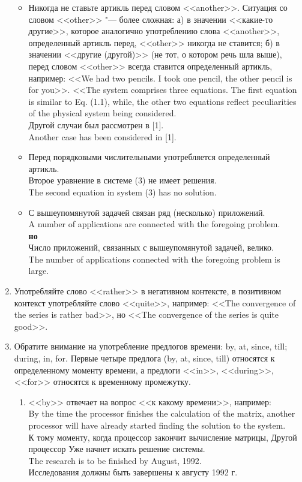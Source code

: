 \documentclass[a5paper, 10pt, twoside, numbers=enddot]{scrartcl}
\begin{document}
\begin{enumerate}
\begin{itemize}
   \item Никогда не ставьте артикль перед словом <<another>>. Ситуация со словом <<other>> "--- более сложная: а) в значении <<какие-то другие>>, которое аналогично употреблению слова <<another>>, определенный артикль перед, <<other>> никогда не ставится; б) в значении <<другие (другой)>> (не тот, о котором речь шла выше), перед словом <<other>> всегда ставится определенный артикль, например: <<We had two pencils. I took one pencil, the other pencil is for you>>. <<The system comprises three equations. The first equation is similar to Eq. (1.1), while, the other two equations reflect peculiarities of the physical system being considered. \\ [4pt] \textsf{
     Другой случаи был рассмотрен в [1]. \\
     Another case has been considered in [1].}

   \item Перед порядковыми числительными употребляется определенный артикль. \\ [4pt] \textsf{
     Второе уравнение в системе (3) не имеет решения. \\
     The second equation in system (3) has no solution.}

   \item \textsf{С вышеупомянутой задачей связан ряд (несколько) приложений. \\
     A number of applications are connected with the foregoing problem. \\ [4pt]
     \textbf{но} \\ [4pt]
     Число приложений, связанных с вышеупомянутой задачей, велико. \\
     The number of applications connected with the foregoing problem is large.}
  \end{itemize}

  \item Употребляйте слово <<rather>> в негативном контексте, в позитивном контекст употребляйте слово <<quite>>, например: <<The convergence of the series is rather bad>>, но <<The convergence of the series is quite good>>.

  \item Обратите внимание на употребление предлогов времени: by, at, since, till; during, in, for.
  Первые четыре предлога (by, at, since, till) относятся к определенному моменту времени, а предлоги <<in>>, <<during>>, <<for>> относятся к временному промежутку.
  \begin{enumerate}
    \item <<by>> отвечает на вопрос <<к какому времени>>, например: \\ [4pt]
    \textsf{By the time the processor finishes the calculation of the matrix, another processor will have already started finding the solution to the system.\\
    К тому моменту, когда процессор закончит вычисление матрицы, Другой процессор Уже начнет искать решение системы.\\ [3pt]
    The research is to be finished by August, 1992. \\
    Исследования должны быть завершены к августу 1992 г.}


\end{enumerate}
\end{enumerate}
\end{document}
